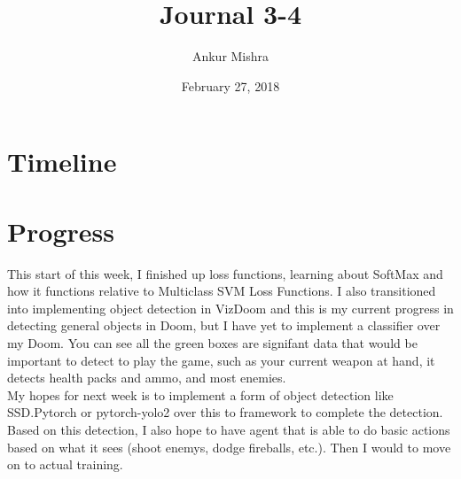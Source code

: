 \documentclass[11pt]{article}
\author{Ankur Mishra}
\date{February 27, 2018}
\title{Journal 3-4}
\begin{document}
\maketitle
\tableofcontents

\section{Timeline}
\label{sec-1}
\section{Progress}
\label{sec-2}
This start of this week, I finished up loss functions, learning about SoftMax and how it functions relative 
to Multiclass SVM Loss Functions. I also transitioned into implementing object detection in VizDoom and this is my
current progress in detecting general objects in Doom, but I have yet to implement a classifier over my 
Doom. You can see all the green boxes are signifant data that would be important to detect to play the game, such as your 
current weapon at hand, it detects health packs and ammo, and most enemies. \\
My hopes for next week is to implement a form of object detection like SSD.Pytorch or pytorch-yolo2 over this to framework
to complete the detection. Based on this detection, I also hope to have agent that is able to do basic actions based on
what it sees (shoot enemys, dodge fireballs, etc.). Then I would to move on to actual training. 
\end{document}

